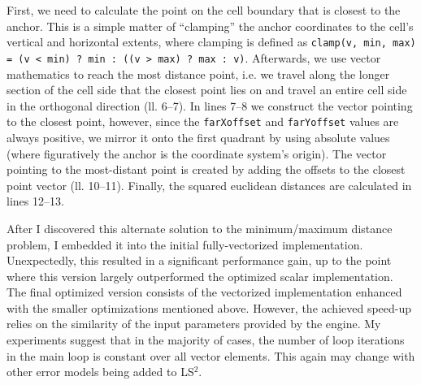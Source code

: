 First, we need to calculate the point on the cell boundary that is closest to the anchor. This is a simple matter of ``clamping'' the anchor coordinates to the cell's vertical and horizontal extents, where clamping is defined as \texttt{clamp(v, min, max) = (v < min) ? min : ((v > max) ? max : v)}. Afterwards, we use vector mathematics to reach the most distance point, i.e. we travel along the longer section of the cell side that the closest point lies on and travel an entire cell side in the orthogonal direction (ll. 6--7). In lines 7--8 we construct the vector pointing to the closest point, however, since the \texttt{farXoffset} and \texttt{farYoffset} values are always positive, we mirror it onto the first quadrant by using absolute values (where figuratively the anchor is the coordinate system's origin). The vector pointing to the most-distant point is created by adding the offsets to the closest point vector (ll. 10--11). Finally, the squared euclidean distances are calculated in lines 12--13.

After I discovered this alternate solution to the minimum/maximum distance problem, I embedded it into the initial fully-vectorized implementation. Unexpectedly, this resulted in a significant performance gain, up to the point where this version largely outperformed the optimized scalar implementation. The final optimized version consists of the vectorized implementation enhanced with the smaller optimizations mentioned above. However, the achieved speed-up relies on the similarity of the input parameters provided by the engine. My experiments suggest that in the majority of cases, the number of loop iterations in the main loop is constant over all vector elements. This again may change with other error models being added to LS$^{2}$.

